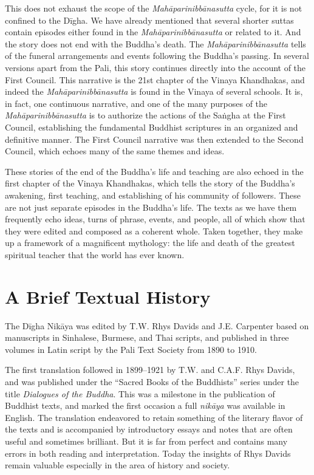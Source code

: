 \documentclass[12pt,openany]{book}%
\begin{document}
This does not exhaust the scope of the \textit{\textsanskrit{Mahāparinibbānasutta}} cycle, for it is not confined to the \textsanskrit{Dīgha}. We have already mentioned that several shorter suttas contain episodes either found in the \textit{\textsanskrit{Mahāparinibbānasutta}} or related to it. And the story does not end with the Buddha’s death. The \textit{\textsanskrit{Mahāparinibbānasutta}} tells of the funeral arrangements and events following the Buddha’s passing. In several versions apart from the Pali, this story continues directly into the account of the First Council. This narrative is the 21st chapter of the Vinaya Khandhakas, and indeed the \textit{\textsanskrit{Mahāparinibbānasutta}} is found in the Vinaya of several schools. It is, in fact, one continuous narrative, and one of the many purposes of the \textit{\textsanskrit{Mahāparinibbānasutta}} is to authorize the actions of the \textsanskrit{Saṅgha} at the First Council, establishing the fundamental Buddhist scriptures in an organized and definitive manner. The First Council narrative was then extended to the Second Council, which echoes many of the same themes and ideas.

These stories of the end of the Buddha’s life and teaching are also echoed in the first chapter of the Vinaya Khandhakas, which tells the story of the Buddha’s awakening, first teaching, and establishing of his community of followers. These are not just separate episodes in the Buddha’s life. The texts as we have them frequently echo ideas, turns of phrase, events, and people, all of which show that they were edited and composed as a coherent whole. Taken together, they make up a framework of a magnificent mythology: the life and death of the greatest spiritual teacher that the world has ever known.

\section*{A Brief Textual History}

The \textsanskrit{Dīgha} \textsanskrit{Nikāya} was edited by T.W. Rhys Davids and J.E. Carpenter based on manuscripts in Sinhalese, Burmese, and Thai scripts, and published in three volumes in Latin script by the Pali Text Society from 1890 to 1910.

The first translation followed in 1899–1921 by T.W. and C.A.F. Rhys Davids, and was published under the “Sacred Books of the Buddhists” series under the title \textit{Dialogues of the Buddha}. This was a milestone in the publication of Buddhist texts, and marked the first occasion a full \textit{\textsanskrit{nikāya}} was available in English. The translation endeavored to retain something of the literary flavor of the texts and is accompanied by introductory essays and notes that are often useful and sometimes brilliant. But it is far from perfect and contains many errors in both reading and interpretation. Today the insights of Rhys Davids remain valuable especially in the area of history and society.
\end{document}
